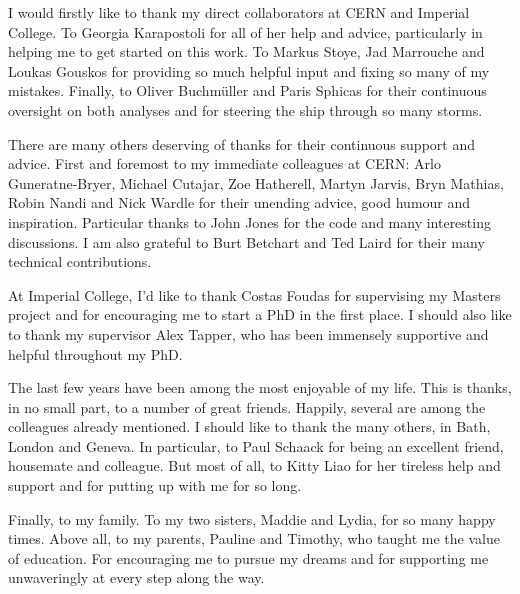 \begin{acknowledgements}
   I would firstly like to thank my direct collaborators at
  \ac{CERN} and Imperial College. To Georgia Karapostoli for all of her help and
  advice, particularly in helping me to get started on this work. To Markus
  Stoye, Jad Marrouche and Loukas Gouskos for providing so much helpful input
  and fixing so many of my mistakes. Finally, to Oliver Buchm\"{u}ller and Paris
  Sphicas for their continuous oversight on both analyses and for steering the
  ship through so many storms.

  There are many others deserving of thanks for their continuous support and
  advice. First and foremost to my immediate colleagues at \ac{CERN}: Arlo
  Guneratne-Bryer, Michael Cutajar, Zoe Hatherell, Martyn Jarvis, Bryn Mathias,
  Robin Nandi and Nick Wardle for their unending advice, good humour and
  inspiration. Particular thanks to John Jones for the  code and many
  interesting discussions. I am also grateful to Burt Betchart and Ted Laird for
  their many technical contributions.

  At Imperial College, I'd like to thank Costas Foudas for supervising my
  Masters project and for encouraging me to start a PhD in the first place.  I
  should also like to thank my supervisor Alex Tapper, who has been immensely
  supportive and helpful throughout my PhD.

  The last few years have been among the most enjoyable of my life. This is
  thanks, in no small part, to a number of great friends. Happily, several are
  among the colleagues already mentioned. I should like to thank the many
  others, in Bath, London and Geneva. In particular, to Paul Schaack for being
  an excellent friend, housemate and colleague. But most of all, to Kitty Liao
  for her tireless help and support and for putting up with me for so long.

  Finally, to my family. To my two sisters, Maddie and Lydia, for so many happy
  times. Above all, to my parents, Pauline and Timothy, who taught me the value
  of education. For encouraging me to pursue my dreams and for supporting me
  unwaveringly at every step along the way.
\end{acknowledgements}




\tableofcontents

\listoffigures
\listoftables

